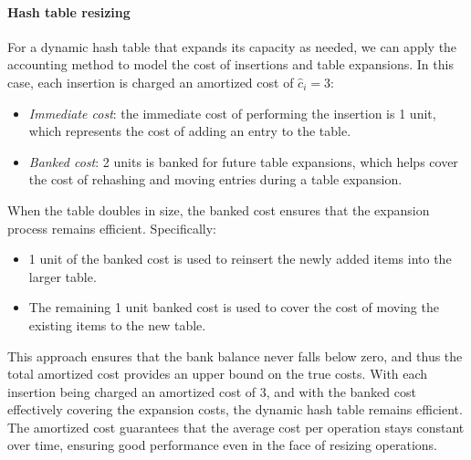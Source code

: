 \paragraph*{Hash table resizing}
For a dynamic hash table that expands its capacity as needed, we can apply the accounting method to model the cost of insertions and table expansions. 
In this case, each insertion is charged an amortized cost of $\hat{c}_i=3$:
\begin{itemize}
    \item \textit{Immediate cost}: the immediate cost of performing the insertion is 1 unit, which represents the cost of adding an entry to the table.
    \item \textit{Banked cost}: 2 units is banked for future table expansions, which helps cover the cost of rehashing and moving entries during a table expansion.
\end{itemize}
When the table doubles in size, the banked cost ensures that the expansion process remains efficient. Specifically:
\begin{itemize}
    \item 1 unit of the banked cost is used to reinsert the newly added items into the larger table.
    \item The remaining 1 unit banked cost is used to cover the cost of moving the existing items to the new table.
\end{itemize}
This approach ensures that the bank balance never falls below zero, and thus the total amortized cost provides an upper bound on the true costs. 
With each insertion being charged an amortized cost of 3, and with the banked cost effectively covering the expansion costs, the dynamic hash table remains efficient. 
The amortized cost guarantees that the average cost per operation stays constant over time, ensuring good performance even in the face of resizing operations.